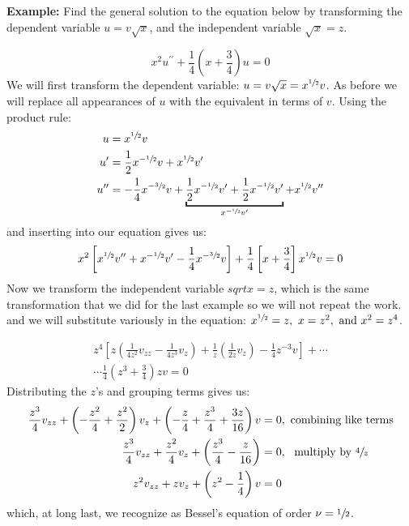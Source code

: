 \vspace{1.0cm}

\noindent\textbf{Example: }Find the general solution to the equation below by transforming the dependent variable $u = v\sqrt{x}$, and the independent variable $\sqrt{x} = z$.

\begin{equation*}
x^2u^{\prime \prime}+\frac{1}{4}\left(x+\frac{3}{4}\right)u = 0
\end{equation*}
\noindent We will first transform the dependent variable: $u=v\sqrt{x} = x^{\sfrac{1}{2}}v$.  As before we will replace all appearances of $u$ with the equivalent in terms of $v$.  Using the product rule:
\begin{align*}
u &= x^{\sfrac{1}{2}}v \\
u^{\prime} &= \frac{1}{2}x^{-\sfrac{1}{2}}v + x^{\sfrac{1}{2}}v^{\prime} \\
u^{\prime \prime} &= -\frac{1}{4}x^{-\sfrac{3}{2}}v+\underbracket{\frac{1}{2}x^{-\sfrac{1}{2}}v^{\prime} + \frac{1}{2}x^{-\sfrac{1}{2}}v^{\prime}}_{x^{-\sfrac{1}{2}}v^{\prime}}+x^{\sfrac{1}{2}}v^{\prime \prime}
\end{align*}
and inserting into our equation gives us:
\begin{equation*}
x^2\left[x^{\sfrac{1}{2}}v^{\prime \prime}+x^{-\sfrac{1}{2}}v^{\prime}-\frac{1}{4}x^{-\sfrac{3}{2}}v \right] + \frac{1}{4}\left[x+\frac{3}{4}\right]x^{\sfrac{1}{2}}v = 0
\end{equation*}
Now we transform the independent variable $sqrt{x} = z$, which is the same transformation that we did for the last example so we will not repeat the work. and we will substitute variously in the equation: $x^{\sfrac{1}{2}}=z, \ x=z^2, \ \text{and }x^2=z^4$. 

\begin{multline*}
z^4\left[ z\left(\frac{1}{4z^2}v_{zz}-\frac{1}{4z^3}v_z\right) + \frac{1}{z}\left(\frac{1}{2z}v_z \right)-\frac{1}{4}z^{-3}v\right]+ \cdots \\
\cdots \frac{1}{4}\left(z^3+\frac{3}{4}\right)zv = 0 
\end{multline*}
Distributing the $z$'s and grouping terms gives us:
\begin{align*}
\frac{z^3}{4}v_{zz}+\left(-\frac{z^2}{4}+\frac{z^2}{2} \right)v_z + \left(-\frac{z}{4}+\frac{z^3}{4}+\frac{3z}{16}\right)v &= 0, \text{ combining like terms}\\
\frac{z^3}{4}v_{zz}+\frac{z^2}{4}v_z + \left(\frac{z^3}{4}-\frac{z}{16} \right) &= 0, \ \text{ multiply by }\sfrac{4}{z} \\
z^2v_{zz}+zv_z+\left(z^2-\frac{1}{4}\right)v &= 0
\end{align*}
which, at long last, we recognize as Bessel's equation of order $\nu = \sfrac{1}{2}$.

